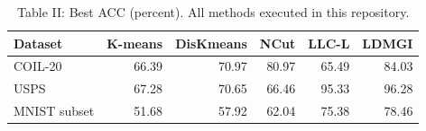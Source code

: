 \begin{table}[ht]
\centering
\caption{Table II: Best ACC (percent). All methods executed in this repository.}
\begin{tabular}{lrrrrr}
\toprule
Dataset & K-means & DisKmeans & NCut & LLC-L & LDMGI \\
\midrule
COIL-20 & 66.39 & 70.97 & 80.97 & 65.49 & 84.03 \\
USPS & 67.28 & 70.65 & 66.46 & 95.33 & 96.28 \\
MNIST subset & 51.68 & 57.92 & 62.04 & 75.38 & 78.46 \\
\bottomrule
\end{tabular}
\end{table}
